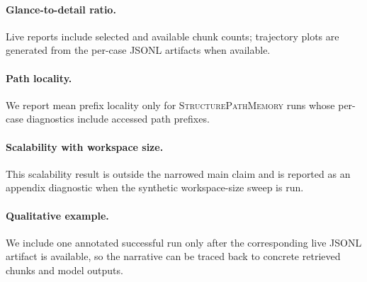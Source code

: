 \paragraph{Glance-to-detail ratio.} Live reports include selected and
available chunk counts; trajectory plots are generated from the
per-case JSONL artifacts when available.

\paragraph{Path locality.} We report mean prefix locality only for
\textsc{StructurePathMemory} runs whose per-case diagnostics include
accessed path prefixes.

\paragraph{Scalability with workspace size.} This scalability result
is outside the narrowed main claim and is reported as an appendix
diagnostic when the synthetic workspace-size sweep is run.

\paragraph{Qualitative example.} We include one annotated successful
run only after the corresponding live JSONL artifact is available, so
the narrative can be traced back to concrete retrieved chunks and
model outputs.
